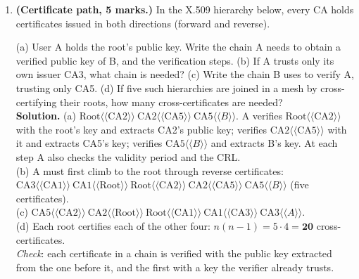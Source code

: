 \begin{enumerate}[leftmargin=1.6em,itemsep=4pt]
  \item \textbf{(Certificate path, 5 marks.)} In the X.509 hierarchy below, every CA holds certificates issued in both directions (forward and reverse).
  \begin{center}
  \end{center}
  (a) User A holds the root's public key. Write the chain A needs to obtain a verified public key of B, and the verification steps. (b) If A trusts only its own issuer CA3, what chain is needed? (c) Write the chain B uses to verify A, trusting only CA5. (d) If five such hierarchies are joined in a mesh by cross-certifying their roots, how many cross-certificates are needed?\\
  \textbf{Solution.} (a) $\text{Root}\langle\!\langle \text{CA2} \rangle\!\rangle\ \text{CA2}\langle\!\langle \text{CA5} \rangle\!\rangle\ \text{CA5}\langle\!\langle B \rangle\!\rangle$. A verifies $\text{Root}\langle\!\langle \text{CA2} \rangle\!\rangle$ with the root's key and extracts CA2's public key; verifies $\text{CA2}\langle\!\langle \text{CA5} \rangle\!\rangle$ with it and extracts CA5's key; verifies $\text{CA5}\langle\!\langle B \rangle\!\rangle$ and extracts B's key. At each step A also checks the validity period and the CRL.\\
  (b) A must first climb to the root through reverse certificates: $\text{CA3}\langle\!\langle \text{CA1} \rangle\!\rangle\ \text{CA1}\langle\!\langle \text{Root} \rangle\!\rangle\ \text{Root}\langle\!\langle \text{CA2} \rangle\!\rangle\ \text{CA2}\langle\!\langle \text{CA5} \rangle\!\rangle\ \text{CA5}\langle\!\langle B \rangle\!\rangle$ (five certificates).\\
  (c) $\text{CA5}\langle\!\langle \text{CA2} \rangle\!\rangle\ \text{CA2}\langle\!\langle \text{Root} \rangle\!\rangle\ \text{Root}\langle\!\langle \text{CA1} \rangle\!\rangle\ \text{CA1}\langle\!\langle \text{CA3} \rangle\!\rangle\ \text{CA3}\langle\!\langle A \rangle\!\rangle$.\\
  (d) Each root certifies each of the other four: $n(n-1) = 5 \cdot 4 = \mathbf{20}$ cross-certificates.\\
  \emph{Check}: each certificate in a chain is verified with the public key extracted from the one before it, and the first with a key the verifier already trusts.


\end{enumerate}

